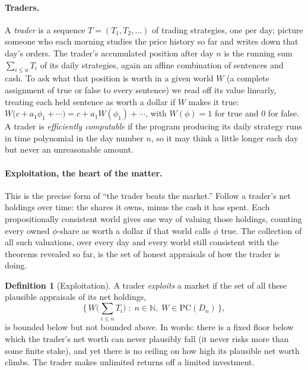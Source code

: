 \documentclass[10pt]{article}
\theoremstyle{definition}
\newtheorem{definition}[theorem]{Definition}
\theoremstyle{remark}
\newcommand{\N}{\mathbb{N}}
\newcommand{\PC}{\mathrm{PC}}
\begin{document}
\paragraph{Traders.} A \emph{trader} is a sequence $T = (T_1, T_2, \dots)$ of trading strategies, one per day; picture someone who each morning studies the price history so far and writes down that day's orders. The trader's accumulated position after day $n$ is the running sum $\sum_{i \le n} T_i$ of its daily strategies, again an affine combination of sentences and cash. To ask what that position is worth in a given world $W$ (a complete assignment of true or false to every sentence) we read off its value linearly, treating each held sentence as worth a dollar if $W$ makes it true: $W\big(c + a_1\phi_1 + \cdots\big) = c + a_1 W(\phi_1) + \cdots$, with $W(\phi) = 1$ for true and $0$ for false. A trader is \emph{efficiently computable} if the program producing its daily strategy runs in time polynomial in the day number $n$, so it may think a little longer each day but never an unreasonable amount.

\paragraph{Exploitation, the heart of the matter.} This is the precise form of ``the trader beats the market.'' Follow a trader's net holdings over time: the shares it owns, minus the cash it has spent. Each propositionally consistent world gives one way of valuing those holdings, counting every owned $\phi$-share as worth a dollar if that world calls $\phi$ true. The collection of all such valuations, over every day and every world still consistent with the theorems revealed so far, is the set of honest appraisals of how the trader is doing.

\begin{definition}[Exploitation]
\label{def:exploit}
A trader \emph{exploits} a market if the set of all these plausible appraisals of its net holdings,
\[
\Big\{\, W\Big(\textstyle\sum_{i \le n} T_i\Big) \;:\; n \in \N,\; W \in \PC(D_n) \,\Big\},
\]
is bounded below but not bounded above. In words: there is a fixed floor below which the trader's net worth can never plausibly fall (it never risks more than some finite stake), and yet there is no ceiling on how high its plausible net worth climbs. The trader makes unlimited returns off a limited investment.
\end{definition}
\end{document}
